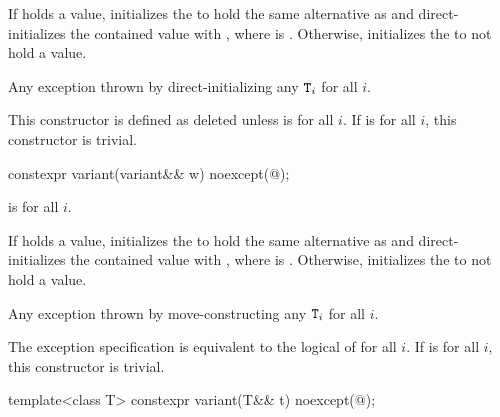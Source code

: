 \begin{itemdescr}
\pnum
\effects
If  holds a value, initializes the  to hold the same
alternative as  and direct-initializes the contained value
with , where  is .
Otherwise, initializes the  to not hold a value.

\pnum
\throws
Any exception thrown by direct-initializing any $\texttt{\protect T}_i$ for all $i$.

\pnum
\remarks
This constructor is defined as deleted unless
 is  for all $i$.
If 
is  for all $i$, this constructor is trivial.
\end{itemdescr}

%
\begin{itemdecl}
constexpr variant(variant&& w) noexcept(@\seebelow@);
\end{itemdecl}

\begin{itemdescr}
\pnum
\constraints
{} is  for all $i$.

\pnum
\effects
If  holds a value, initializes the  to hold the same
alternative as  and direct-initializes the contained value with
, where  is .
Otherwise, initializes the  to not hold a value.

\pnum
\throws
Any exception thrown by move-constructing any $\texttt{\protect T}_i$ for all $i$.

\pnum
\remarks
The exception specification is equivalent to the logical  of
 for all $i$.
If 
is  for all $i$, this constructor is trivial.
\end{itemdescr}

%
\begin{itemdecl}
template<class T> constexpr variant(T&& t) noexcept(@\seebelow@);
\end{itemdecl}

